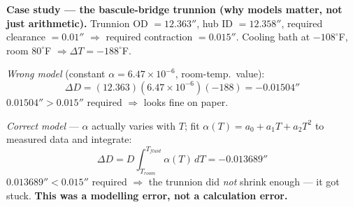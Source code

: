 \begin{examplebox}
\textbf{Case study — the bascule-bridge trunnion (why models matter, not just arithmetic).} Trunnion OD $=12.363''$, hub ID $=12.358''$, required clearance $=0.01''$ $\Rightarrow$ required contraction $=0.015''$. Cooling bath at $-108^\circ$F, room $80^\circ$F $\Rightarrow \Delta T=-188^\circ$F.

\emph{Wrong model} (constant $\alpha=6.47\times10^{-6}$, room-temp.\ value):
\[
\Delta D = (12.363)(6.47\times10^{-6})(-188) = -0.01504''
\]
$0.01504'' > 0.015''$ required $\Rightarrow$ looks fine on paper.

\emph{Correct model} — $\alpha$ actually varies with $T$; fit $\alpha(T)=a_0+a_1T+a_2T^2$ to measured data and integrate:
\[
\Delta D = D\int_{T_{room}}^{T_{fluid}}\alpha(T)\,dT = -0.013689''
\]
$0.013689'' < 0.015''$ required $\Rightarrow$ the trunnion did \emph{not} shrink enough — it got stuck. \textbf{This was a modelling error, not a calculation error.}
\end{examplebox}

